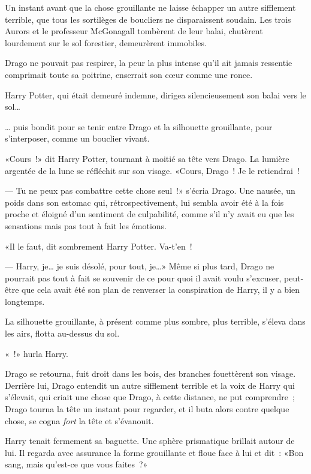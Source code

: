 \begin{em}
Un instant avant que la chose grouillante ne laisse échapper un autre sifflement terrible, que tous les sortilèges de boucliers ne disparaissent soudain. Les trois Aurors et le professeur McGonagall tombèrent de leur balai, chutèrent lourdement sur le sol forestier, demeurèrent immobiles.

Drago ne pouvait pas respirer, la peur la plus intense qu'il ait jamais ressentie comprimait toute sa poitrine, enserrait son cœur comme une ronce.

Harry Potter, qui était demeuré indemne, dirigea silencieusement son balai vers le sol…

… puis bondit pour se tenir entre Drago et la silhouette grouillante, pour s'interposer, comme un bouclier vivant.

«Cours~!» dit Harry Potter, tournant à moitié sa tête vers Drago. La lumière argentée de la lune se réfléchit sur son visage. «Cours, Drago~! Je le retiendrai~!

--- Tu ne peux pas combattre cette chose seul~!» s'écria Drago. Une nausée, un poids dans son estomac qui, rétrospectivement, lui sembla avoir été à la fois proche et éloigné d'un sentiment de culpabilité, comme s'il n'y avait eu que les sensations mais pas tout à fait les émotions.

«Il le faut, dit sombrement Harry Potter. Va-t'en~!

--- Harry, je… je suis désolé, pour tout, je…» Même si plus tard, Drago ne pourrait pas tout à fait se souvenir de ce pour quoi il avait voulu s'excuser, peut-être que cela avait été son plan de renverser la conspiration de Harry, il y a bien longtemps.

La silhouette grouillante, à présent comme plus sombre, plus terrible, s'éleva dans les airs, flotta au-dessus du sol.

«~!» hurla Harry.

Drago se retourna, fuit droit dans les bois, des branches fouettèrent son visage. Derrière lui, Drago entendit un autre sifflement terrible et la voix de Harry qui s'élevait, qui criait une chose que Drago, à cette distance, ne put comprendre~; Drago tourna la tête un instant pour regarder, et il buta alors contre quelque chose, se cogna \emph{fort} la tête et s'évanouit.
\end{em}

\later

Harry tenait fermement sa baguette. Une sphère prismatique brillait autour de lui. Il regarda avec assurance la forme grouillante et floue face à lui et dit~: «Bon sang, mais qu'est-ce que vous faites~?»

